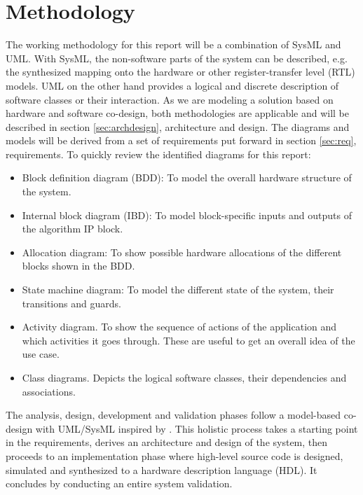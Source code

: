 \section{Methodology}

The working methodology for this report will be a combination of SysML and UML. With SysML, the non-software parts of the system can be described, e.g. the synthesized mapping onto the hardware or other register-transfer level (RTL) models. UML on the other hand provides a logical and discrete description of software classes or their interaction. As we are modeling a solution based on hardware and software co-design, both methodologies are applicable and will be described in section \ref{sec:archdesign}, architecture and design. The diagrams and models will be derived from a set of requirements put forward in section \ref{sec:req}, requirements. To quickly review the identified diagrams for this report:

\begin{itemize}
	\item Block definition diagram (BDD): To model the overall hardware structure of the system.
	\item Internal block diagram (IBD): To model block-specific inputs and outputs of the algorithm IP block.
	\item Allocation diagram: To show possible hardware allocations of the different blocks shown in the BDD.
	\item State machine diagram: To model the different state of the system, their transitions and guards.
	\item Activity diagram. To show the sequence of actions of the application and which activities it goes through. These are useful to get an overall idea of the use case.
	\item Class diagrams. Depicts the logical software classes, their dependencies and associations.
\end{itemize}

The analysis, design, development and validation phases follow a model-based co-design with UML/SysML inspired by \cite{codesign}. This holistic process takes a starting point in the requirements, derives an architecture and design of the system, then proceeds to an implementation phase where high-level source code is designed, simulated and synthesized to a hardware description language (HDL). It concludes by conducting an entire system validation.
